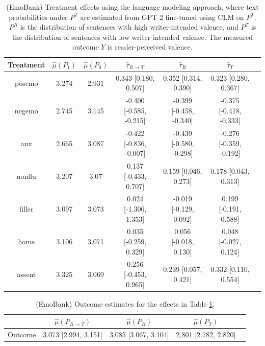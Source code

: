 \documentclass{article}
\begin{document}
\begin{table}[!ht]
\centering
\begin{tabular}{c|cccccc}
\toprule
    Treatment   &   $\hat{\mu}(P_1)$ &   $\hat{\mu}(P_0)$ & $\hat{\tau}_{R \rightarrow T}$   & $\hat{\tau}_R$          & $\hat{\tau}_T$          \\
\midrule
    posemo      &              3.274 &              2.931 & 0.343 [0.180, 0.507]             & 0.352 [0.314, 0.390]    & 0.323 [0.280, 0.367]    \\
    negemo      &              2.745 &              3.145 & -0.400 [-0.585, -0.215]          & -0.399 [-0.458, -0.340] & -0.375 [-0.418, -0.333] \\
    anx         &              2.665 &              3.087 & -0.422 [-0.836, -0.007]          & -0.439 [-0.580, -0.298] & -0.276 [-0.359, -0.192] \\
    nonflu      &              3.207 &              3.07  & 0.137 [-0.433, 0.707]            & 0.159 [0.046, 0.273]    & 0.178 [0.043, 0.313]    \\
    filler      &              3.097 &              3.073 & 0.024 [-1.306, 1.353]            & -0.019 [-0.129, 0.092]  & 0.199 [-0.191, 0.588]   \\
    home        &              3.106 &              3.071 & 0.035 [-0.259, 0.329]            & 0.056 [-0.018, 0.130]   & 0.048 [-0.027, 0.124]   \\
    assent      &              3.325 &              3.069 & 0.256 [-0.453, 0.965]            & 0.239 [0.057, 0.421]    & 0.332 [0.110, 0.554]    \\
\bottomrule
\end{tabular}
\caption{(EmoBank) Treatment effects using the language modeling approach, where text probabilities under $P^T$ are estimated from GPT-2 fine-tuned using CLM on $P^T$. $P^R$ is the distribution of sentences with high writer-intended valence, and $P^T$ is the distribution of sentences with low writer-intended valence. The measured outcome $Y$ is reader-perceived valence.}
\label{tab:results_clm_gpt2_finetuned_emobank_pt}
\end{table}

\begin{table}[!ht]
\centering
\begin{tabular}{c|cccc}
\toprule
    & $\hat{\mu}(P_{R \rightarrow T})$   & $\hat{\mu}(P_R)$     & $\hat{\mu}(P_T)$     \\
\midrule
    Outcome & 3.073 [2.994, 3.151]               & 3.085 [3.067, 3.104] & 2.801 [2.782, 2.820] \\
\bottomrule
\end{tabular}
\caption{(EmoBank) Outcome estimates for the effects in Table \ref{tab:results_clm_gpt2_finetuned_emobank_pt}.}
\label{tab:results_clm_gpt2_finetuned_emobank_pt_outcome}
\end{table}
\end{document}

